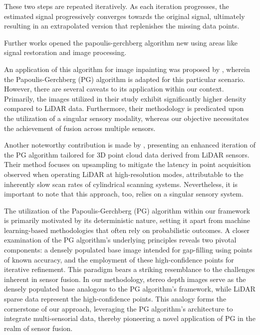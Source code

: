 \documentclass[conference]{IEEEtran}
\begin{document}
These two steps are repeated iteratively. As each iteration progresses, the estimated signal progressively converges towards the original signal, ultimately resulting in an extrapolated version that replenishes the missing data points.

Further works opened the papoulis-gerchberg algorithm new using areas like signal restoration and image processing.

An application of this algorithm for image inpainting was proposed by \cite{pg-image-inpaint-2009}, wherein the Papoulis-Gerchberg (PG) algorithm is adapted for this particular scenario. However, there are several caveats to its application within our context. Primarily, the images utilized in their study exhibit significantly higher density compared to LiDAR data. Furthermore, their methodology is predicated upon the utilization of a singular sensory modality, whereas our objective necessitates the achievement of fusion across multiple sensors.

Another noteworthy contribution is made by \cite{ozbay2015high}, presenting an enhanced iteration of the PG algorithm tailored for 3D point cloud data derived from LiDAR sensors. Their method focuses on upsampling to mitigate the latency in point acquisition observed when operating LiDAR at high-resolution modes, attributable to the inherently slow scan rates of cylindrical scanning systems. Nevertheless, it is important to note that this approach, too, relies on a singular sensory system.

The utilization of the Papoulis-Gerchberg (PG) algorithm within our framework is primarily motivated by its deterministic nature, setting it apart from machine learning-based methodologies that often rely on probabilistic outcomes. A closer examination of the PG algorithm's underlying principles reveals two pivotal components: a densely populated base image intended for gap-filling using points of known accuracy, and the employment of these high-confidence points for iterative refinement. This paradigm bears a striking resemblance to the challenges inherent in sensor fusion. In our methodology, stereo depth images serve as the densely populated base analogous to the PG algorithm's framework, while LiDAR sparse data represent the high-confidence points. This analogy forms the cornerstone of our approach, leveraging the PG algorithm's architecture to integrate multi-sensorial data, thereby pioneering a novel application of PG in the realm of sensor fusion.
\end{document}

